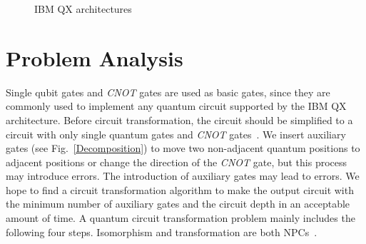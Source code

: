 \documentclass[runningheads]{llncs}
\begin{document}
\begin{figure}
{
}
\caption{IBM QX architectures}
\label{IBM}
\end{figure}


\section{Problem Analysis}
\label{Problem Analysis}
Single qubit gates and \textit{CNOT} gates are used as basic gates, since they are commonly used to implement any quantum circuit supported by the IBM QX architecture. Before circuit transformation, the circuit should be simplified to a circuit with only single quantum gates and \textit{CNOT} gates~\cite{2005Mttnen,1995Barenco}. We insert auxiliary gates (see Fig.~\ref{Decomposition}) to move two non-adjacent quantum positions to adjacent positions or change the direction of the \textit{CNOT} gate, but this process may introduce errors. The introduction of auxiliary gates may lead to errors. We hope to find a circuit transformation algorithm to make the output circuit with the minimum number of auxiliary gates and the circuit depth in an acceptable amount of time.
A quantum circuit transformation problem mainly includes the following four steps. Isomorphism and transformation are both NPCs~\cite{2018QubitSiraichi}.
\end{document}
